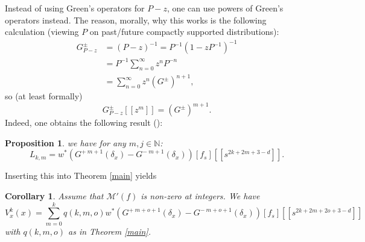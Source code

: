 \documentclass[11pt]{article}
\def\N{{\mathbb{N}}}
\def\M{\mathcal{M}}
\newtheorem{prop}[df]{Proposition}
\newtheorem{cor}[df]{Corollary}
\begin{document}
Instead of using Green's  operators for $P-z$, one can use powers of Green's operators instead. The reason, morally, why this works is the following calculation (viewing $P$ on past/future compactly supported distributions):
\begin{align*}
	G^\pm_{P-z}&=(P-z)^{-1}=P^{-1}(1-zP^{-1})^{-1}\\
	&=P^{-1}\sum\limits_{n=0}^\infty z^n P^{-n}\\
	&=\sum\limits_{n=0}^\infty z^n (G^\pm)^{n+1},
\end{align*}
so (at least formally)
\[G^\pm_{P-z}[[z^m]]=(G^\pm)^{m+1}.\]
Indeed, one obtains the following result (\cite[Proposition 5.2.17]{Ron}):
\begin{prop}
	we have for any $m,j\in \N$:
	\[L_{k,m}=w^*\left (G^{+\ m+1}(\delta_x)-G^{-\ m+1}(\delta_x)\right )[f_s][[s^{2k+2m+3-d}]].\]
\end{prop}
Inserting this into Theorem \ref{main} yields
\begin{cor}
	\label{Vwithpowers}
	Assume that $\M'(f)$ is non-zero at integers.
	We have
	\[V^k_x(x)=\sum\limits_{m=0}^k q(k,m,o)w^*\left (G^{+\ m+o+1}(\delta_x)-G^{-\ m+o+1}(\delta_x)\right )[f_s][[s^{2k+2m+2o+3-d}]]\]
	with $q(k,m,o)$ as in Theorem \ref{main}.
\end{cor}
\end{document}
